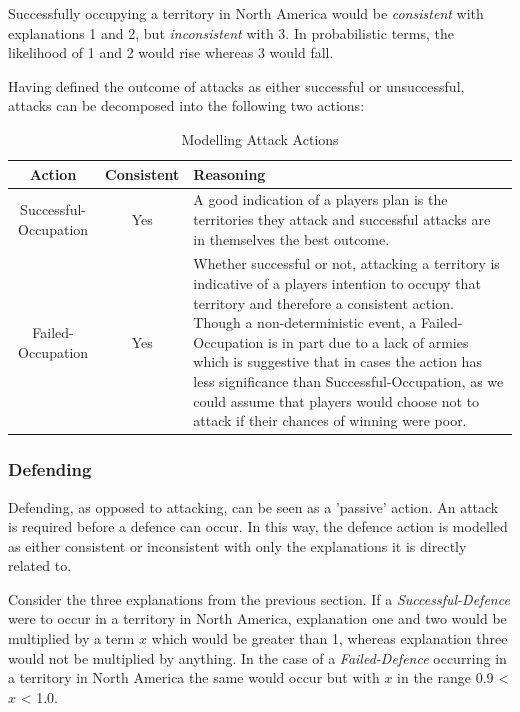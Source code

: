 \documentclass[parskip]{cs4rep}
\begin{document}
Successfully occupying a territory in North America would be \textit{consistent} with explanations 1 and 2, but \textit{inconsistent} with 3. In probabilistic terms, the likelihood of 1 and 2 would rise whereas 3 would fall.

Having defined the outcome of attacks as either successful or unsuccessful, attacks can be decomposed into the following two actions: 

\begin{table}[ht]
\centering
\begin{tabular}{|c|c|p{8cm}|}
\hline 
\textbf{Action} & \textbf{Consistent}  & \textbf{Reasoning} \\ 
\hline 
Successful-Occupation & Yes & A good indication of a players plan is the territories they attack and successful attacks are in themselves the best outcome. \\ 
\hline 
Failed-Occupation & Yes & Whether successful or not, attacking a territory is indicative of a players intention to occupy that territory and therefore a consistent action. Though a non-deterministic event, a Failed-Occupation is in part due to a lack of armies which is suggestive that in cases the action has less significance than Successful-Occupation, as we could assume that players would choose not to attack if their chances of winning were poor.\\ 
\hline
\end{tabular}
\caption{Modelling Attack Actions}
\label{table:attack-modelling}
\end{table}

\newpage

\subsubsection{Defending}

Defending, as opposed to attacking, can be seen as a 'passive' action. An attack is required before a defence can occur. In this way, the defence action is modelled as either consistent or inconsistent with only the explanations it is directly related to. 

Consider the three explanations from the previous section. If a \textit{Successful-Defence} were to occur in a territory in North America, explanation one and two would be multiplied by a term $x$ which would be greater than 1, whereas explanation three would not be multiplied by anything. In the case of a \textit{Failed-Defence} occurring in a territory in North America the same would occur but with $x$ in the range 0.9 < $x$ < 1.0. 
\end{document}
